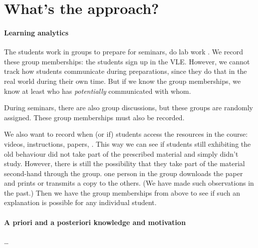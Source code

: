 \section{What's the approach?}

\paragraph{Learning analytics}

The students work in groups to prepare for seminars, do lab work \etc.
We record these group memberships: the students sign up in the \ac{VLE}.
However, we cannot track how students communicate during preparations, since 
they do that in the real world during their own time.
But if we know the group memberships, we know at least who has 
\emph{potentially} communicated with whom.

During seminars, there are also group discussions, but these groups are 
randomly assigned.
These group memberships must also be recorded.

We also want to record when (or if) students access the resources in the 
course:
videos,
instructions,
papers,
\etc.
This way we can see if students still exhibiting the old behaviour did not take 
part of the prescribed material and simply didn't study.
However, there is still the possibility that they take part of the material 
second-hand through the group.
\Eg one person in the group downloads the paper and prints or transmits a copy 
to the others.
(We have made such observations in the past.)
Then we have the group memberships from above to see if such an explanation is 
possible for any individual student.

\paragraph{A priori and a posteriori knowledge and motivation}

\dots
